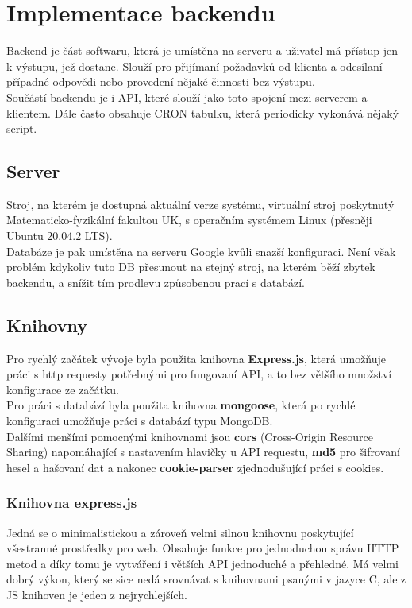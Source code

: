 \chapter{Implementace backendu}
Backend je část softwaru, která je umístěna na serveru a uživatel má přístup jen
k výstupu, jež dostane. Slouží pro přijímaní požadavků od klienta a odesílaní
případné odpovědi nebo provedení nějaké činnosti bez výstupu.
\\
Součástí backendu je i API, které slouží jako toto spojení mezi serverem a
klientem. Dále často obsahuje CRON tabulku, která periodicky vykonává nějaký
script.

\section{Server}
Stroj, na kterém je dostupná aktuální verze systému, virtuální stroj poskytnutý
Matematicko-fyzikální fakultou UK, s operačním systémem Linux (přesněji Ubuntu
20.04.2 LTS).
\\
Databáze je pak umístěna na serveru Google kvůli snazší konfiguraci. Není však
problém kdykoliv tuto DB přesunout na stejný stroj, na kterém běží zbytek
backendu, a snížit tím prodlevu způsobenou prací s databází.


\section{Knihovny}
Pro rychlý začátek vývoje byla použita knihovna \textbf{Express.js}, která
umožňuje práci s http requesty potřebnými pro fungovaní API, a to 
bez většího množství konfigurace ze začátku.
\\
Pro práci s databází byla použita knihovna \textbf{mongoose}, která po rychlé konfiguraci
umožňuje práci s databází typu MongoDB.
\\
Dalšími menšími pomocnými knihovnami jsou
\textbf{cors} (Cross-Origin Resource Sharing) napomáhající s nastavením hlavičky u API requestu,
\textbf{md5} pro šifrovaní hesel a hašovaní dat a nakonec
\textbf{cookie-parser} zjednodušující práci s cookies.

\subsection{Knihovna express.js}
Jedná se o minimalistickou a zároveň velmi silnou knihovnu poskytující
všestranné prostředky pro web. Obsahuje funkce pro jednoduchou správu HTTP metod
a díky tomu je vytváření i větších API jednoduché a přehledné. Má velmi dobrý
výkon, který se sice nedá srovnávat s knihovnami psanými v jazyce C, ale z JS
knihoven je jeden z nejrychlejších.

